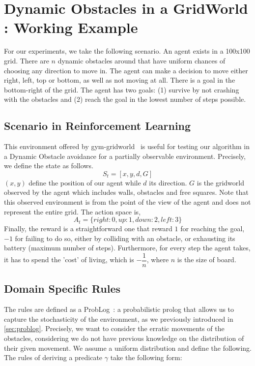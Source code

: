 \section{Dynamic Obstacles in a GridWorld : Working Example} 
\label{gridworlddyn}

For our experiments, we take the following scenario. An agent exists in a 100x100 grid. 
There are $n$ dynamic obstacles around that have uniform chances of choosing any direction to move in. 
The agent can make a decision to move either right, left, top or bottom, as well as not moving at all. 
There is a goal in the bottom-right of the grid. The agent has two goals: (1) survive by not crashing with the obstacles and (2) reach the goal in the lowest number of steps possible. 

\subsection{Scenario in Reinforcement Learning}

This environment offered by gym-gridworld~\cite{gym_minigrid} is useful for testing our algorithm in a Dynamic Obstacle avoidance for a partially observable 
environment. Precisely, we define the state as follows. 
\begin{equation*}
  S_t = [x, y, d, G]
\end{equation*}
$(x,y)$ define the position of our agent while $d$ its direction. $G$
is the gridworld observed by the agent which includes walls, obstacles
and free squares. Note that this observed environment is from the point of the view 
of the agent and does not represent the entire grid. 
The action space is, 
\begin{equation*}
  A_t = \{ right: 0, up: 1, down: 2, left: 3 \}
\end{equation*}
Finally, the reward is a straightforward one that reward $1$ for reaching the goal, $-1$ for failing to do so, either by colliding with an obstacle, 
or exhausting its battery (maximum number of steps). Furthermore, for every step the agent takes, it has to spend the 'cost' of living, which is $-\dfrac{1}{n}$, where $n$ is the size of board.


\subsection{Domain Specific Rules}
The rules are defined as a ProbLog~\cite{problog}: a probabilistic prolog that allows us to capture 
the stochasticity of the environment, as we previously introduced in \ref{sec:problog}. Precisely, we want to consider the erratic movements of the obstacles, considering 
we do not have previous knowledge on the distribution of their given movement. We assume a uniform distribution and define the following. 
The rules of \dio{} deriving a predicate $\gamma$ take the following form: 

